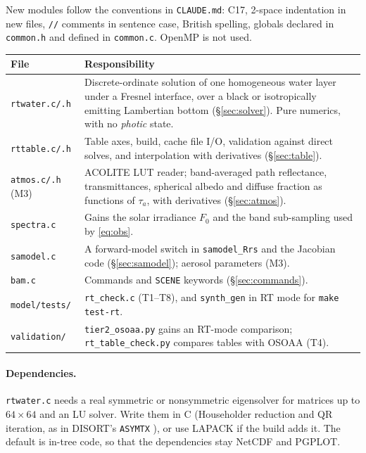 \documentclass[11pt]{article}
\numberwithin{equation}{section}
\newcommand{\code}[1]{\texttt{#1}}
\begin{document}
New modules follow the conventions in \code{CLAUDE.md}: C17, 2-space indentation in new files,
\code{//} comments in sentence case, British spelling, globals declared in \code{common.h} and
defined in \code{common.c}. OpenMP is not used.

\begin{longtable}{@{}p{2.6cm}p{11.8cm}@{}}
\toprule
File & Responsibility\\
\midrule
\endhead
\code{rtwater.c/.h} & Discrete-ordinate solution of one homogeneous water layer under a Fresnel
interface, over a black or isotropically emitting Lambertian bottom (\S\ref{sec:solver}). Pure
numerics, with no \textit{photic} state.\\
\code{rttable.c/.h} & Table axes, build, cache file I/O, validation against direct solves, and
interpolation with derivatives (\S\ref{sec:table}).\\
\code{atmos.c/.h} (M3) & ACOLITE LUT reader; band-averaged path reflectance, transmittances,
spherical albedo and diffuse fraction as functions of $\tau_a$, with derivatives
(\S\ref{sec:atmos}).\\
\code{spectra.c} & Gains the solar irradiance $F_0$ and the band sub-sampling used by
\eqref{eq:obs}.\\
\code{samodel.c} & A forward-model switch in \code{samodel\_Rrs} and the Jacobian code
(\S\ref{sec:samodel}); aerosol parameters (M3).\\
\code{bam.c} & Commands and \code{SCENE} keywords (\S\ref{sec:commands}).\\
\code{model/tests/} & \code{rt\_check.c} (T1--T8), and \code{synth\_gen} in RT mode for
\code{make test-rt}.\\
\code{validation/} & \code{tier2\_osoaa.py} gains an RT-mode comparison; \code{rt\_table\_check.py}
compares tables with OSOAA (T4).\\
\bottomrule
\end{longtable}

\paragraph{Dependencies.} \code{rtwater.c} needs a real symmetric or nonsymmetric eigensolver for
matrices up to $64\times64$ and an LU solver. Write them in C (Householder reduction and QR
iteration, as in DISORT's \code{ASYMTX} \cite{stamnes1988}), or use LAPACK if the build adds
it. The default is in-tree code, so that the dependencies stay NetCDF and PGPLOT.

\end{document}
